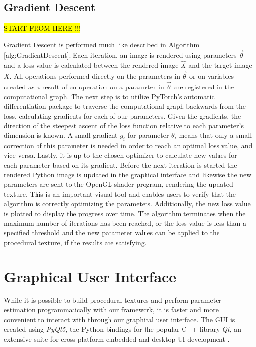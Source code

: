 \subsection{Gradient Descent}

\hl{START FROM HERE !!!}

Gradient Descent is performed much like described in Algorithm \ref{alg:GradientDescent}. Each iteration, an image is rendered using parameters $\vec{\theta}$ and a loss value is calculated between the rendered image $\hat{X}$ and the target image $X$. All operations performed directly on the parameters in $\vec{\theta}$ or on variables created as a result of an operation on a parameter in $\vec{\theta}$ are registered in the computational graph. The next step is to utilize PyTorch's automatic differentiation package to traverse the computational graph backwards from the loss, calculating gradients for each of our parameters. Given the gradients, the direction of the steepest ascent of the loss function relative to each parameter's dimension is known. A small gradient $g_i$ for parameter $\theta_i$ means that only a small correction of this parameter is needed in order to reach an optimal loss value, and vice versa. Lastly, it is up to the chosen optimizer to calculate new values for each parameter based on its gradient. Before the next iteration is started the rendered Python image is updated in the graphical interface and likewise the new parameters are sent to the OpenGL shader program, rendering the updated texture. This is an important visual tool and enables users to verify that the algorithm is correctly optimizing the parameters. Additionally, the new loss value is plotted to display the progress over time. The algorithm terminates when the maximum number of iterations has been reached, or the loss value is less than a specified threshold and the new parameter values can be applied to the procedural texture, if the results are satisfying. 

\section{Graphical User Interface}

While it is possible to build procedural textures and perform parameter estimation programmatically with our framework, it is faster and more convenient to interact with \dipter{} through our graphical user interface. The GUI is created using \textit{PyQt5}, the Python bindings for the popular C++ library \textit{Qt}, an extensive suite for cross-platform embedded and desktop UI development \cite{riverbankcomputing_2020_what,theqtcompany_qt}.

